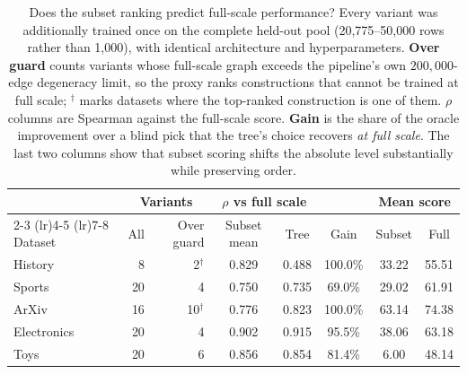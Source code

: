 \begin{table}[htbp]
\centering
\small
\caption{Does the subset ranking predict full-scale performance? Every variant
was additionally trained once on the complete held-out pool (20{,}775--50{,}000
rows rather than 1{,}000), with identical architecture and hyperparameters.
\textbf{Over guard} counts variants whose full-scale graph exceeds the
pipeline's own $200{,}000$-edge degeneracy limit, so the proxy ranks
constructions that cannot be trained at full scale; $^{\dagger}$ marks datasets
where the top-ranked construction is one of them. $\rho$ columns are Spearman
against the full-scale score. \textbf{Gain} is the share of the oracle
improvement over a blind pick that the tree's choice recovers \emph{at full
scale}. The last two columns show that subset scoring shifts the absolute level
substantially while preserving order.}
\label{tab:full_scale}
\vspace{4pt}
\begin{tabular}{lrrccccc}
\toprule
 & \multicolumn{2}{c}{Variants} & \multicolumn{2}{c}{$\rho$ vs full scale}
 & & \multicolumn{2}{c}{Mean score} \\
\cmidrule(lr){2-3} \cmidrule(lr){4-5} \cmidrule(lr){7-8}
Dataset & All & Over guard & Subset mean & Tree & Gain & Subset & Full \\
\midrule
History & 8 & 2$^{\dagger}$ & 0.829 & 0.488 & 100.0\% & 33.22 & 55.51 \\
Sports & 20 & 4 & 0.750 & 0.735 & 69.0\% & 29.02 & 61.91 \\
ArXiv & 16 & 10$^{\dagger}$ & 0.776 & 0.823 & 100.0\% & 63.14 & 74.38 \\
Electronics & 20 & 4 & 0.902 & 0.915 & 95.5\% & 38.06 & 63.18 \\
Toys & 20 & 6 & 0.856 & 0.854 & 81.4\% & 6.00 & 48.14 \\
\bottomrule
\end{tabular}
\end{table}
